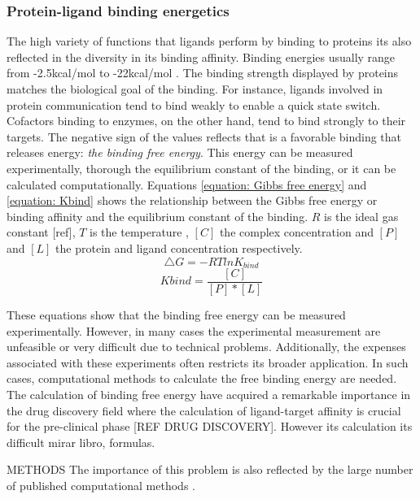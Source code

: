 \documentclass[12pt, a4paper,twoside]{tesi_upf}
\begin{document}
\subsubsection{Protein-ligand binding energetics}\label{binding_energetics}
 
\par The high variety of functions that ligands perform by binding to proteins its also reflected in the diversity in its binding affinity. Binding energies usually range from -2.5kcal/mol to -22kcal/mol \cite{Dunn2001}. The binding strength displayed by proteins matches the biological goal of the binding. For instance, ligands involved in protein communication tend to bind weakly to enable a quick state switch. Cofactors binding to enzymes, on the other hand,  tend to bind strongly to their targets.  The negative sign of the values reflects that is a favorable binding that releases energy: \textit{the binding free energy}.  This energy can be measured experimentally, thorough the equilibrium constant of the binding, or it can be calculated computationally. Equations \ref{equation: Gibbs free energy} and \ref{equation: Kbind} shows the relationship between the Gibbs free energy or binding affinity and the equilibrium constant of the binding. $R$ is the ideal gas constant [ref], $T$ is the temperature , $[C]$ the complex concentration and $[P]$ and $[L]$ the protein and ligand concentration respectively. 
\begin{equation}\label{equation: Gibbs free energy}
\bigtriangleup G=-RTlnK_{bind} 
\end{equation}
\begin{equation}\label{equation: Kbind}
Kbind = \frac{[C]}{[P]*[L]}
\end{equation}
\par These equations show that the binding free energy can be measured experimentally. However, in many cases the experimental measurement are unfeasible or very difficult due to technical problems. Additionally, the expenses associated with these experiments often restricts its broader application. In such cases, computational methods to calculate the free binding energy are needed. The calculation of binding free energy have acquired a remarkable importance in the drug discovery field where the calculation of ligand-target affinity is crucial for the pre-clinical phase [REF DRUG DISCOVERY]. However its calculation its difficult mirar libro, formulas. 

\par METHODS The importance of this problem is also reflected by the large number of published computational methods \cite{Gilson2007}.
\end{document}
